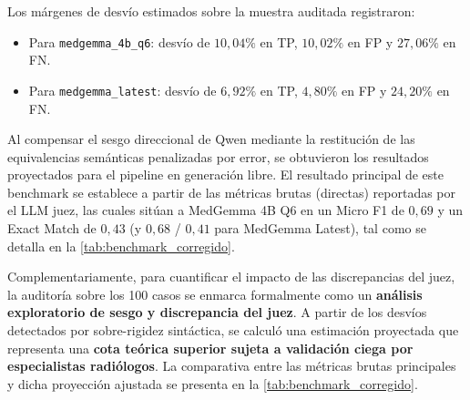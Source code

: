 \documentclass[../tesis.tex]{subfiles}
\begin{document}
Los márgenes de desvío estimados sobre la muestra auditada registraron:
\begin{itemize}
    \item Para \texttt{medgemma\_4b\_q6}: desvío de $10{,}04\%$ en TP, $10{,}02\%$ en FP y $27{,}06\%$ en FN.
    \item Para \texttt{medgemma\_latest}: desvío de $6{,}92\%$ en TP, $4{,}80\%$ en FP y $24{,}20\%$ en FN.
\end{itemize}

Al compensar el sesgo direccional de Qwen mediante la restitución de las equivalencias semánticas penalizadas por error, se obtuvieron los resultados proyectados para el pipeline en generación libre. El resultado principal de este benchmark se establece a partir de las métricas brutas (directas) reportadas por el LLM juez, las cuales sitúan a MedGemma 4B Q6 en un Micro F1 de $0{,}69$ y un Exact Match de $0{,}43$ (y $0{,}68$ / $0{,}41$ para MedGemma Latest), tal como se detalla en la \autoref{tab:benchmark_corregido}. 

Complementariamente, para cuantificar el impacto de las discrepancias del juez, la auditoría sobre los 100 casos se enmarca formalmente como un \textbf{análisis exploratorio de sesgo y discrepancia del juez}. A partir de los desvíos detectados por sobre-rigidez sintáctica, se calculó una estimación proyectada que representa una \textbf{cota teórica superior sujeta a validación ciega por especialistas radiólogos}. La comparativa entre las métricas brutas principales y dicha proyección ajustada se presenta en la \autoref{tab:benchmark_corregido}.
\end{document}
